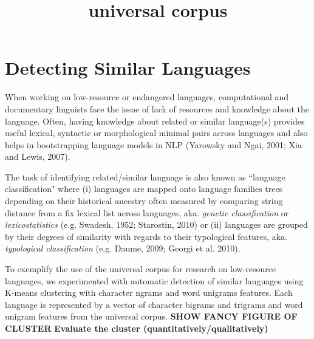 \documentclass[11pt]{article}
\title{\textbf{universal corpus}}
\date{}
\begin{document}
\maketitle

\section{Detecting Similar Languages}

When working on low-resource or endangered languages, computational and documentary linguists face the issue of lack of resources and knowledge about the language. Often, having knowledge about related or similar language(s) provides useful lexical, syntactic or morphological minimal pairs across languages and also helps in bootstrapping language models in NLP (Yarowsky
and Ngai, 2001; Xia and Lewis, 2007). 

The task of identifying related/similar language is also known as ``language classification" where (i) languages are mapped onto language families trees depending on their historical ancestry often measured by comparing string distance from a fix lexical list across languages, aka. \emph{genetic classification} or \emph{lexicostatistics} (e.g. Swadesh, 1952; Starostin, 2010) or (ii) languages are grouped by their degrees of similarity with regards to their typological features, aka. \emph{typological classification} (e.g. Daume, 2009; Georgi et al. 2010).

To exemplify the use of the universal corpus for research on low-resource languages, we experimented with automatic detection of similar languages using K-means clustering with character ngrams and word unigrams features. Each language is represented by a vector of character bigrams and trigrams and word unigram features from the universal corpus. 
\newline \newline
\noindent \textbf{SHOW FANCY FIGURE OF CLUSTER}
\newline \newline
\textbf{Evaluate the cluster (quantitatively/qualitatively)}
\end{document}
